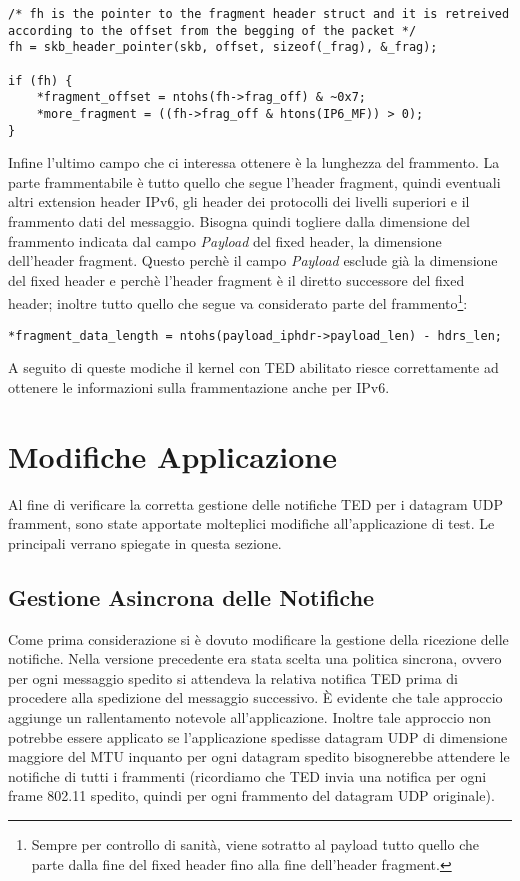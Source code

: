 \documentclass[a4paper,10pt]{article}
\begin{document}
\begin{lstlisting}
/* fh is the pointer to the fragment header struct and it is retreived
according to the offset from the begging of the packet */
fh = skb_header_pointer(skb, offset, sizeof(_frag), &_frag);

if (fh) {
	*fragment_offset = ntohs(fh->frag_off) & ~0x7;
	*more_fragment = ((fh->frag_off & htons(IP6_MF)) > 0);
} 
\end{lstlisting}
 
Infine l'ultimo campo che ci interessa ottenere è la lunghezza del
frammento. La parte frammentabile è tutto quello che segue l'header
fragment, quindi eventuali altri extension header IPv6, gli header dei
protocolli dei livelli superiori e il frammento dati del messaggio.
Bisogna quindi togliere dalla dimensione del frammento indicata dal
campo \emph{Payload} del fixed header, la dimensione dell'header fragment.
Questo perchè il campo \emph{Payload} esclude già la dimensione del fixed
header e perchè l'header fragment è il diretto successore del fixed
header; inoltre tutto quello che segue va considerato parte del
frammento\footnote{Sempre per controllo di sanità, viene sotratto al
payload
tutto quello che parte dalla fine del fixed header fino alla fine
dell'header fragment.}:

\begin{lstlisting}
*fragment_data_length = ntohs(payload_iphdr->payload_len) - hdrs_len;
\end{lstlisting}

A seguito di queste modiche il kernel con TED abilitato riesce
correttamente ad ottenere le informazioni sulla frammentazione anche per
IPv6.

\section{Modifiche Applicazione}
\label{sec:app}

Al fine di verificare la corretta gestione delle notifiche TED per i
datagram UDP framment, sono state apportate molteplici modifiche
all'applicazione di test. Le principali verrano spiegate in questa
sezione.
\subsection{Gestione Asincrona delle Notifiche}
Come prima considerazione si è dovuto modificare la gestione della
ricezione delle notifiche. Nella versione precedente era stata scelta
una politica sincrona, ovvero per ogni messaggio spedito si attendeva
la relativa
notifica TED prima di procedere alla spedizione del messaggio
successivo. È evidente che tale approccio aggiunge un rallentamento
notevole all'applicazione. 
Inoltre tale approccio non potrebbe essere applicato se
l'applicazione spedisse datagram UDP di dimensione maggiore del MTU
inquanto per ogni datagram spedito bisognerebbe attendere le notifiche
di tutti i frammenti (ricordiamo che TED invia una notifica per ogni
frame 802.11 spedito, quindi per ogni frammento del datagram UDP
originale).
\end{document}
